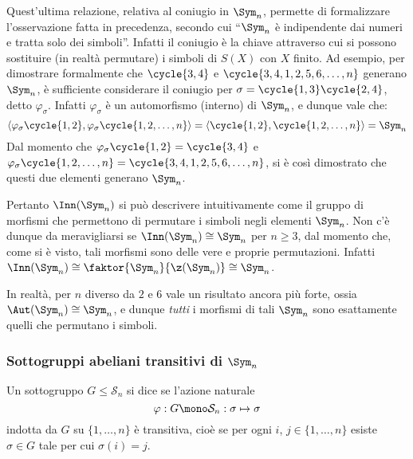 \documentclass[11pt]{scrartcl}
\begin{document}
	\begin{remark}
		Quest'ultima relazione, relativa al coniugio in $\Sym_n$, permette di
		formalizzare l'osservazione fatta in precedenza, secondo cui
		``$\Sym_n$ è indipendente dai numeri e tratta solo dei simboli''. Infatti
		il coniugio è la chiave attraverso cui si possono sostituire (in realtà permutare)
		i simboli di $S(X)$ con $X$ finito. Ad esempio, per dimostrare formalmente che
		$\cycle{3, 4}$ e $\cycle{3, 4, 1, 2, 5, 6, \ldots, n}$ generano $\Sym_n$, è
		sufficiente considerare il coniugio per $\sigma = \cycle{1, 3} \cycle{2, 4}$, detto
		$\varphi_\sigma$. Infatti $\varphi_\sigma$ è un automorfismo (interno) di $\Sym_n$,
		e dunque vale che:
		\[ \langle \varphi_\sigma\cycle{1, 2}, \varphi_\sigma\cycle{1, 2, \ldots, n} \rangle = \langle \cycle{1, 2}, \cycle{1, 2, \ldots, n} \rangle = \Sym_n \]
		Dal momento che $\varphi_\sigma\cycle{1, 2} = \cycle{3, 4}$ e
		$\varphi_\sigma\cycle{1, 2, \ldots, n} = \cycle{3, 4, 1, 2, 5, 6, \ldots, n}$, si
		è così dimostrato che questi due elementi generano $\Sym_n$. \medskip
		
		
		Pertanto $\Inn(\Sym_n)$ si può descrivere intuitivamente come il gruppo di morfismi
		che permettono di permutare i simboli negli elementi $\Sym_n$. Non c'è dunque
		da meravigliarsi se $\Inn(\Sym_n) \cong \Sym_n$ per $n \geq 3$, dal momento
		che, come si è visto, tali morfismi sono delle vere e proprie permutazioni. 
		Infatti $\Inn(\Sym_n) \cong \faktor{\Sym_n}{\z(\Sym_n)} \cong \Sym_n$. \medskip
		
		
		In
		realtà, per $n$ diverso da $2$ e $6$ vale un risultato ancora più forte, ossia
		$\Aut(\Sym_n) \cong \Sym_n$, e dunque \textit{tutti} i morfismi di tali $\Sym_n$
		sono esattamente quelli che permutano i simboli. 
	\end{remark}
	
	\subsubsection{Sottogruppi abeliani transitivi di $\Sym_n$}
	
	\begin{definition}
		Un sottogruppo $G\leqslant \mathcal{S}_n$ si dice  se l'azione
		naturale
		\[
		\varphi: G \mono \mathcal{S}_n :\sigma \mapsto \sigma
		\]indotta da $G$ su $\{1, \ldots, n\}$ è transitiva, cioè se per ogni
		$i$, $j \in \{1, \ldots, n\}$ esiste $\sigma \in G$ tale per cui $\sigma(i) = j$.
	\end{definition}
	
\end{document}
